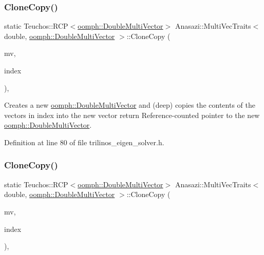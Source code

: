 \subsubsection{\texorpdfstring{Clone\+Copy()}{CloneCopy()}\hspace{0.1cm}{\footnotesize\ttfamily [2/3]}}
{\footnotesize\ttfamily static Teuchos\+::\+R\+CP$<$\hyperlink{classoomph_1_1DoubleMultiVector}{oomph\+::\+Double\+Multi\+Vector}$>$ Anasazi\+::\+Multi\+Vec\+Traits$<$ double, \hyperlink{classoomph_1_1DoubleMultiVector}{oomph\+::\+Double\+Multi\+Vector} $>$\+::Clone\+Copy (\begin{DoxyParamCaption}\item[{const \hyperlink{classoomph_1_1DoubleMultiVector}{oomph\+::\+Double\+Multi\+Vector} \&}]{mv,  }\item[{const std\+::vector$<$ int $>$ \&}]{index }\end{DoxyParamCaption})\hspace{0.3cm}{\ttfamily [inline]}, {\ttfamily [static]}}



Creates a new \hyperlink{classoomph_1_1DoubleMultiVector}{oomph\+::\+Double\+Multi\+Vector} and (deep) copies the contents of the vectors in index into the new vector return Reference-\/counted pointer to the new \hyperlink{classoomph_1_1DoubleMultiVector}{oomph\+::\+Double\+Multi\+Vector}. 



Definition at line 80 of file trilinos\+\_\+eigen\+\_\+solver.\+h.

\mbox{\label{classAnasazi_1_1MultiVecTraits_3_01double_00_01oomph_1_1DoubleMultiVector_01_4_aee537f70bf569a969e3eab89f538588d}} 
\subsubsection{\texorpdfstring{Clone\+Copy()}{CloneCopy()}\hspace{0.1cm}{\footnotesize\ttfamily [3/3]}}
{\footnotesize\ttfamily static Teuchos\+::\+R\+CP$<$\hyperlink{classoomph_1_1DoubleMultiVector}{oomph\+::\+Double\+Multi\+Vector}$>$ Anasazi\+::\+Multi\+Vec\+Traits$<$ double, \hyperlink{classoomph_1_1DoubleMultiVector}{oomph\+::\+Double\+Multi\+Vector} $>$\+::Clone\+Copy (\begin{DoxyParamCaption}\item[{const \hyperlink{classoomph_1_1DoubleMultiVector}{oomph\+::\+Double\+Multi\+Vector} \&}]{mv,  }\item[{const Teuchos\+::\+Range1D \&}]{index }\end{DoxyParamCaption})\hspace{0.3cm}{\ttfamily [inline]}, {\ttfamily [static]}}



